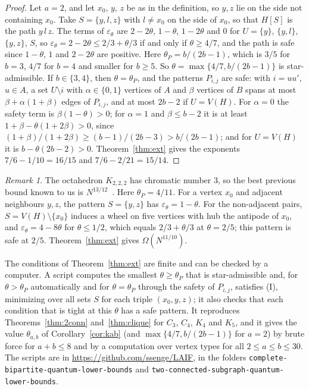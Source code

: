 \documentclass[11pt]{article}
\theoremstyle{remark}
\newtheorem{remark}[theorem]{Remark}
\begin{document}
\begin{proof}
Let $a=2$, and let $x_0$, $y$, $z$ be as in the definition, so $y,z$ lie on the side not containing $x_0$. Take $S=\{y,l,z\}$ with $l\ne x_0$ on the side of $x_0$, so that $H[S]$ is the path $y\,l\,z$. The terms of $\varepsilon_\theta$ are $2-2\theta$, $1-\theta$, $1-2\theta$ and $0$ for $U=\{y\}$, $\{y,l\}$, $\{y,z\}$, $S$, so $\varepsilon_\theta=2-2\theta\le2/3+\theta/3$ if and only if $\theta\ge4/7$, and the path is safe since $1-\theta$, $1$ and $2-2\theta$ are positive. Here $\theta_P=b/(2b-1)$, which is $3/5$ for $b=3$, $4/7$ for $b=4$ and smaller for $b\ge5$. So $\theta=\max\{4/7,b/(2b-1)\}$ is star-admissible. If $b\in\{3,4\}$, then $\theta=\theta_P$, and the patterns $P_{i,j}$ are safe: with $i=uu'$, $u\in A$, a set $U\setminus i$ with $\alpha\in\{0,1\}$ vertices of $A$ and $\beta$ vertices of $B$ spans at most $\beta+\alpha(1+\beta)$ edges of $P_{i,j}$, and at most $2b-2$ if $U=V(H)$. For $\alpha=0$ the safety term is $\beta(1-\theta)>0$; for $\alpha=1$ and $\beta\le b-2$ it is at least $1+\beta-\theta(1+2\beta)>0$, since $(1+\beta)/(1+2\beta)\ge(b-1)/(2b-3)>b/(2b-1)$; and for $U=V(H)$ it is $b-\theta(2b-2)>0$. Theorem~\ref{thm:ext} gives the exponents $7/6-1/10=16/15$ and $7/6-2/21=15/14$.
\end{proof}

\begin{remark}\label{rem:octa}
The octahedron $K_{2,2,2}$ has chromatic number $3$, so the best previous bound known to us is $N^{13/12}$~\cite{CGZ26}. Here $\theta_P=4/11$. For a vertex $x_0$ and adjacent neighbours $y,z$, the pattern $S=\{y,z\}$ has $\varepsilon_\theta=1-\theta$. For the non-adjacent pairs, $S=V(H)\setminus\{x_0\}$ induces a wheel on five vertices with hub the antipode of $x_0$, and $\varepsilon_\theta=4-8\theta$ for $\theta\le1/2$, which equals $2/3+\theta/3$ at $\theta=2/5$; this pattern is safe at $2/5$. Theorem~\ref{thm:ext} gives $\Omega(N^{11/10})$.
\end{remark}

The conditions of Theorem~\ref{thm:ext} are finite and can be checked by a computer. A script computes the smallest $\theta\ge\theta_P$ that is star-admissible and, for $\theta>\theta_P$ automatically and for $\theta=\theta_P$ through the safety of $P_{i,j}$, satisfies (I), minimizing over all sets $S$ for each triple $(x_0,y,z)$; it also checks that each condition that is tight at this $\theta$ has a safe pattern. It reproduces Theorems~\ref{thm:2conn} and~\ref{thm:clique} for $C_3$, $C_4$, $K_4$ and $K_5$, and it gives the value $\theta_{a,b}$ of Corollary~\ref{cor:kab} (and $\max\{4/7,b/(2b-1)\}$ for $a=2$) by brute force for $a+b\le8$ and by a computation over vertex types for all $2\le a\le b\le30$. The scripts are in \url{https://github.com/ssenge/LAIF}, in the folders \texttt{complete-bipartite-quantum-lower-bounds} and \texttt{two-connected-subgraph-quantum-lower-bounds}.
\end{document}
